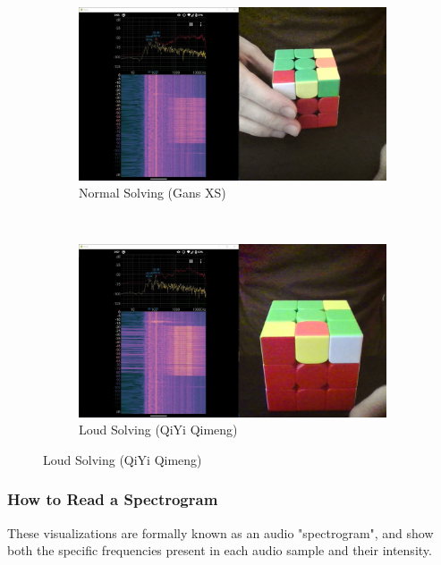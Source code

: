 \begin{figure}\ContinuedFloat
    \centering
    \begin{subfigure}{\textwidth}
        \centering
        \caption{Normal Solving (Gans XS)}
        \label{fig:signal-to-noise-ratio-xs}
        \includegraphics[width=\linewidth]{Figures/4 Protocol Design/Signal to Noise Ratio/xs_background_noise.jpg}
        \vspace*{2mm}
    \end{subfigure}\\
    \begin{subfigure}{\textwidth}
        \centering
        \caption{Loud Solving (QiYi Qimeng)}
        \label{fig:signal-to-noise-ratio-qiyi}
        \includegraphics[width=\linewidth]{Figures/4 Protocol Design/Signal to Noise Ratio/qiyi_background_noise.jpg}
        \vspace*{2mm}
    \end{subfigure}%
\end{figure}

\subsubsection{How to Read a Spectrogram}
\label{subsubsec:how-to-read-a-spectrogram}
These visualizations are formally known as an audio "spectrogram", and show both the specific frequencies present in each audio sample and their intensity.


